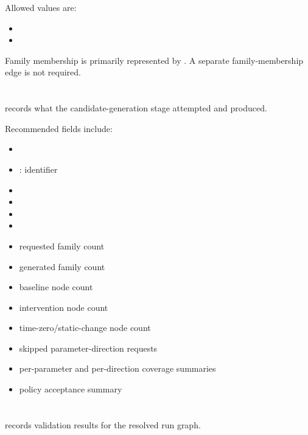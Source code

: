 \documentclass[11pt]{article}
\begin{document}
Allowed  values are:

\begin{itemize}
\item {}
\item {}
\end{itemize}

Family membership is primarily represented by .
A separate family-membership edge is not required.

\section*{\texorpdfstring{}{generation\_report.json}}

 records what the candidate-generation stage attempted and produced.

Recommended fields include:

\begin{itemize}
\item {}
\item {}: \termSimulator identifier
\item {}
\item {}
\item {}
\item {}
\item requested family count
\item generated family count
\item baseline node count
\item intervention node count
\item time-zero/static-change node count
\item skipped parameter-direction requests
\item per-parameter and per-direction coverage summaries
\item policy acceptance summary
\end{itemize}

\section*{\texorpdfstring{}{validation\_report.json}}

 records validation results for the resolved run graph.
\end{document}
